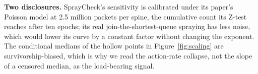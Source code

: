 \textbf{Two disclosures.} SprayCheck's sensitivity is calibrated under its paper's Poisson model at 2.5 million packets per spine, the cumulative count its Z-test reaches after ten epochs; its real join-the-shortest-queue spraying has less noise, which would lower its curve by a constant factor without changing the exponent. The conditional medians of the hollow points in Figure~\ref{fig:scaling} are survivorship-biased, which is why we read the action-rate collapse, not the slope of a censored median, as the load-bearing signal.
